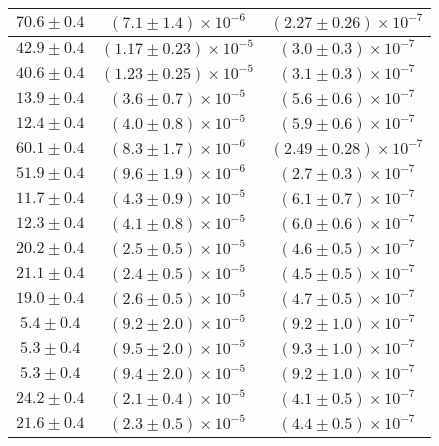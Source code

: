\begin{longtable}[C]{|c|c|c|}
            \hline
            $70.6 \pm 0.4$ & $(7.1 \pm 1.4) \times 10^{-6}$ & $(2.27 \pm 0.26) \times 10^{-7}$ \\
            \hline
            $42.9 \pm 0.4$ & $(1.17 \pm 0.23) \times 10^{-5}$ & $(3.0 \pm 0.3) \times 10^{-7}$ \\
            \hline
            $40.6 \pm 0.4$ & $(1.23 \pm 0.25) \times 10^{-5}$ & $(3.1 \pm 0.3) \times 10^{-7}$ \\
            \hline
            $13.9 \pm 0.4$ & $(3.6 \pm 0.7) \times 10^{-5}$ & $(5.6 \pm 0.6) \times 10^{-7}$ \\
            \hline
            $12.4 \pm 0.4$ & $(4.0 \pm 0.8) \times 10^{-5}$ & $(5.9 \pm 0.6) \times 10^{-7}$ \\
            \hline
            $60.1 \pm 0.4$ & $(8.3 \pm 1.7) \times 10^{-6}$ & $(2.49 \pm 0.28) \times 10^{-7}$ \\
            \hline
            $51.9 \pm 0.4$ & $(9.6 \pm 1.9) \times 10^{-6}$ & $(2.7 \pm 0.3) \times 10^{-7}$ \\
            \hline
            $11.7 \pm 0.4$ & $(4.3 \pm 0.9) \times 10^{-5}$ & $(6.1 \pm 0.7) \times 10^{-7}$ \\
            \hline
            $12.3 \pm 0.4$ & $(4.1 \pm 0.8) \times 10^{-5}$ & $(6.0 \pm 0.6) \times 10^{-7}$ \\
            \hline
            $20.2 \pm 0.4$ & $(2.5 \pm 0.5) \times 10^{-5}$ & $(4.6 \pm 0.5) \times 10^{-7}$ \\
            \hline
            $21.1 \pm 0.4$ & $(2.4 \pm 0.5) \times 10^{-5}$ & $(4.5 \pm 0.5) \times 10^{-7}$ \\
            \hline
            $19.0 \pm 0.4$ & $(2.6 \pm 0.5) \times 10^{-5}$ & $(4.7 \pm 0.5) \times 10^{-7}$ \\
            \hline
            $5.4 \pm 0.4$ & $(9.2 \pm 2.0) \times 10^{-5}$ & $(9.2 \pm 1.0) \times 10^{-7}$ \\
            \hline
            $5.3 \pm 0.4$ & $(9.5 \pm 2.0) \times 10^{-5}$ & $(9.3 \pm 1.0) \times 10^{-7}$ \\
            \hline
            $5.3 \pm 0.4$ & $(9.4 \pm 2.0) \times 10^{-5}$ & $(9.2 \pm 1.0) \times 10^{-7}$ \\
            \hline
            $24.2 \pm 0.4$ & $(2.1 \pm 0.4) \times 10^{-5}$ & $(4.1 \pm 0.5) \times 10^{-7}$ \\
            \hline
            $21.6 \pm 0.4$ & $(2.3 \pm 0.5) \times 10^{-5}$ & $(4.4 \pm 0.5) \times 10^{-7}$ \\

\end{longtable}
